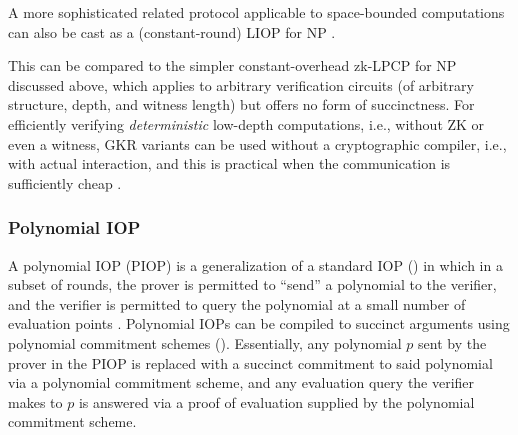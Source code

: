 A more sophisticated related protocol applicable to space-bounded computations can also be cast as a (constant-round) LIOP for NP \cite{2016:RRR:stoc:Constant-round-IP-for-Delegating-Computation,2018:Gold:on-doubly-efficient-IPS}.


This can be compared to the simpler constant-overhead zk-LPCP for NP discussed above, which applies to arbitrary verification circuits (of arbitrary structure, depth, and witness length) but offers no form of succinctness.
For efficiently verifying {\em deterministic} low-depth computations, i.e., without ZK or even a witness, GKR variants can be used without a cryptographic compiler, i.e., with actual interaction, and this is practical when the communication is sufficiently cheap \cite{2017:WJBSTWW:full-accounting}.


\subsubsection{Polynomial IOP}
\label{paradigms:IT:linear-IOP:polynomial-IOP}
A polynomial IOP (PIOP) is a generalization of a standard IOP () in which in a subset of rounds, the prover is permitted to ``send'' a polynomial to the verifier, and the verifier is permitted to query the polynomial at a small number of evaluation points \cite{2019:BFS:transparent-SNARKs-from-DARK-compilers, 2020:CHMMVW:Marlin}.
Polynomial IOPs can be compiled to succinct arguments using polynomial commitment schemes ().
Essentially, any polynomial $p$ sent by the prover in the PIOP is replaced with a succinct commitment to said polynomial via a polynomial commitment scheme, and any evaluation query the verifier makes to $p$ is answered via a proof of evaluation supplied by the polynomial commitment scheme.

